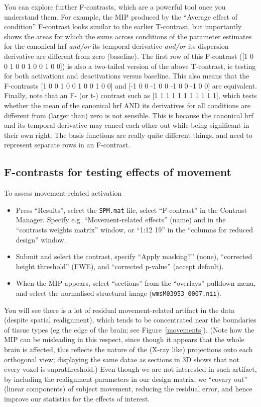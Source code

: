 You can explore further F-contrasts, which are a powerful tool once you understand them. For example, the MIP produced by the ``Average effect of condition'' F-contrast looks similar to the earlier T-contrast, but importantly shows the areas for which the sums across conditions of the parameter estimates for the canonical hrf \emph{and/or} its temporal derivative \emph{and/or} its dispersion derivative are different from zero (baseline). The first row of this F-contrast ([1 0 0 1 0 0 1 0 0 1 0 0]) is also a two-tailed version of the above T-contrast, ie testing for both activations and deactivations versus baseline. This also means that the F-contrasts [1 0 0 1 0 0 1 0 0 1 0 0] and [-1 0 0 -1 0 0 -1 0 0 -1 0 0] are equivalent. Finally, note that an F- (or t-) contrast such as [1 1 1 1 1 1 1 1 1 1 1], which tests whether the mean of the canonical hrf AND its derivatives for all conditions are different from (larger than) zero is not sensible. This is because the canonical hrf and its temporal derivative may cancel each other out while being significant in their own right. The basis functions are really quite different things, and need to represent separate rows in an F-contrast. 

\subsection{F-contrasts for testing effects of movement}

To assess movement-related activation
\begin{itemize}
\item Press ``Results'', select the \texttt{SPM.mat} file, select ``F-contrast'' in the Contrast Manager. Specify e.g. ``Movement-related effects'' (name) and 
in the ``contrasts weights matrix'' window, or ``1:12 19'' in the ``columns for reduced design'' window.
\item Submit and select the contrast, specify ``Apply masking?'' (none), ``corrected height threshold'' (FWE), and ``corrected p-value'' (accept default). 
\item When the MIP appears, select ``sections'' from the ``overlays'' pulldown menu, and select the normalised structural image (\texttt{wmsM03953\_0007.nii}).
\end{itemize}

You will see there is a lot of residual movement-related artifact in the data (despite spatial realignment), which tends to be concentrated near the boundaries of tissue types (eg the edge of the brain; see Figure~\ref{movements}). (Note how the MIP can be misleading in this respect, since though it appears that the whole brain is affected, this reflects the nature of the (X-ray like) projections onto each orthogonal view; displaying the same datae as sections in 3D shows that not every voxel is suprathreshold.)  Even though we are not interested in such artifact, by including the realignment parameters in our design matrix, we ``covary out'' (linear components) of subject movement, reducing the residual error, and hence improve our statistics for the effects of interest.

